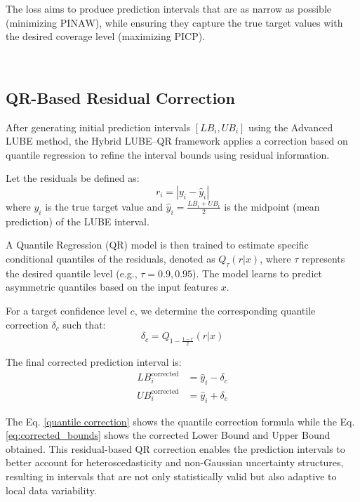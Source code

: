 The loss aims to produce prediction intervals that are as narrow as possible (minimizing $\text{PINAW}$), while ensuring they capture the true target values with the desired coverage level (maximizing $\text{PICP}$).

\\

\subsection{QR-Based Residual Correction}

After generating initial prediction intervals $[LB_i, UB_i]$ using the Advanced LUBE method, the Hybrid LUBE–QR framework applies a correction based on quantile regression to refine the interval bounds using residual information.

Let the residuals be defined as:
\begin{equation}
r_i = |y_i - \hat{y}_i|
\label{residual}
\end{equation}
where $y_i$ is the true target value and $\hat{y}_i = \frac{LB_i + UB_i}{2}$ is the midpoint (mean prediction) of the LUBE interval.

A Quantile Regression (QR) model is then trained to estimate specific conditional quantiles of the residuals, denoted as $Q_{\tau}(r|x)$, where $\tau$ represents the desired quantile level (e.g., $\tau = 0.9, 0.95$). The model learns to predict asymmetric quantiles based on the input features $x$.

For a target confidence level $c$, we determine the corresponding quantile correction $\delta_c$ such that:
\begin{equation}
\delta_c = Q_{1 - \frac{1 - c}{2}}(r|x)
\label{quantile correction}
\end{equation}

The final corrected prediction interval is:
\begin{subequations} \label{eq:corrected_bounds}
\begin{align}
LB_i^{\text{corrected}} &= \hat{y}_i - \delta_c \\
UB_i^{\text{corrected}} &= \hat{y}_i + \delta_c
\end{align}
\end{subequations}


The Eq. \ref{quantile correction} shows the quantile correction formula while the Eq. \ref{eq:corrected_bounds} shows the corrected Lower Bound and Upper Bound obtained. This residual-based QR correction enables the prediction intervals to better account for heteroscedasticity and non-Gaussian uncertainty structures, resulting in intervals that are not only statistically valid but also adaptive to local data variability.
\\

